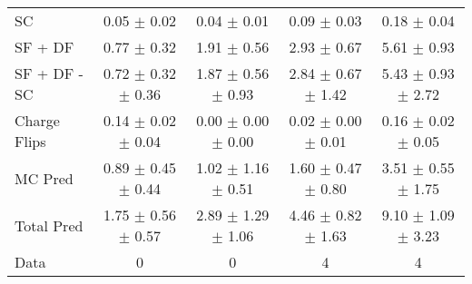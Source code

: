 \begin{tabular}{l|cccc}
                                 SC &  0.05 $\pm$  0.02 &  0.04 $\pm$  0.01 &  0.09 $\pm$  0.03 &  0.18 $\pm$  0.04 \\
                            SF + DF &  0.77 $\pm$  0.32 &  1.91 $\pm$  0.56 &  2.93 $\pm$  0.67 &  5.61 $\pm$  0.93 \\
\hline
                       SF + DF - SC &  0.72 $\pm$  0.32 $\pm$  0.36 &  1.87 $\pm$  0.56 $\pm$  0.93 &  2.84 $\pm$  0.67 $\pm$  1.42 &  5.43 $\pm$  0.93 $\pm$  2.72 \\
\hline\hline
                       Charge Flips &  0.14 $\pm$  0.02 $\pm$  0.04 &  0.00 $\pm$  0.00 $\pm$  0.00 &  0.02 $\pm$  0.00 $\pm$  0.01 &  0.16 $\pm$  0.02 $\pm$  0.05 \\
\hline
                            MC Pred &  0.89 $\pm$  0.45 $\pm$  0.44 &  1.02 $\pm$  1.16 $\pm$  0.51 &  1.60 $\pm$  0.47 $\pm$  0.80 &  3.51 $\pm$  0.55 $\pm$  1.75 \\
\hline
                         Total Pred &  1.75 $\pm$  0.56 $\pm$  0.57 &  2.89 $\pm$  1.29 $\pm$  1.06 &  4.46 $\pm$  0.82 $\pm$  1.63 &  9.10 $\pm$  1.09 $\pm$  3.23 \\
\hline\hline
                               Data &     0 &     0 &     4 &     4 \\
\hline\hline
\end{tabular}

